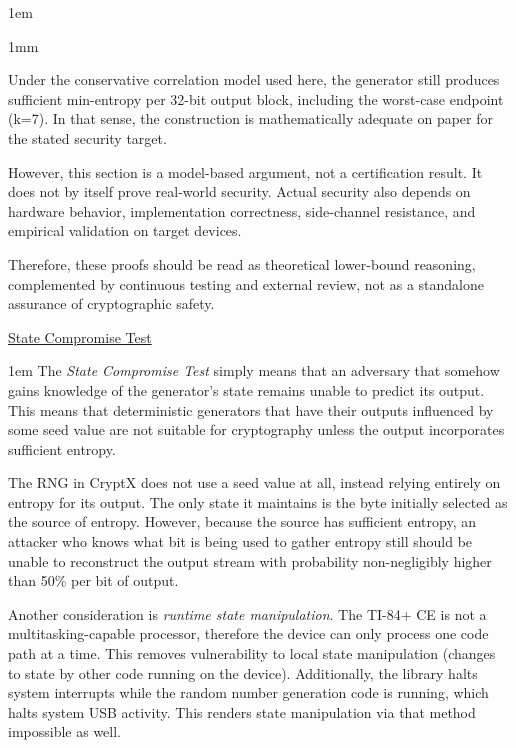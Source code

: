 \documentclass[titlepage]{report}
\renewcommand{\qed}{}
\renewenvironment{proof}{\begin{mdframed}[backgroundcolor=ltgray]\begin{addmargin}[1mm]{1mm}\footnotesize\begin{newproof}}{\end{newproof}\end{addmargin}\end{mdframed}\qed}
\begin{document}
\begin{addmargin}[1em]{1em}
\begin{proof}
				Under the conservative correlation model used here, the generator still produces sufficient min-entropy per 32-bit output block, including the worst-case endpoint (k=7). In that sense, the construction is mathematically adequate on paper for the stated security target.
				
				However, this section is a model-based argument, not a certification result. It does not by itself prove real-world security. Actual security also depends on hardware behavior, implementation correctness, side-channel resistance, and empirical validation on target devices.
				
				Therefore, these proofs should be read as theoretical lower-bound reasoning, complemented by continuous testing and external review, not as a standalone assurance of cryptographic safety.
		\end{proof}
		
	\end{addmargin}
	\ul{State Compromise Test}
	\begin{addmargin}[1em]{1em}
		The \textit{State Compromise Test} simply means that an adversary that somehow gains knowledge of the generator's state remains unable to predict its output. This means that deterministic generators that have their outputs influenced by some seed value are not suitable for cryptography unless the output incorporates sufficient entropy.
		
		The RNG in CryptX does not use a seed value at all, instead relying entirely on entropy for its output. The only state it maintains is the byte initially selected as the source of entropy. However, because the source has sufficient entropy, an attacker who knows what bit is being used to gather entropy still should be unable to reconstruct the output stream with probability non-negligibly higher than 50\% per bit of output.
		
		Another consideration is \textit{runtime state manipulation}. The TI-84+ CE is not a multitasking-capable processor, therefore the device can only process one code path at a time. This removes vulnerability to local state manipulation (changes to state by other code running on the device). Additionally, the library halts system interrupts while the random number generation code is running, which halts system USB activity. This renders state manipulation via that method impossible as well.
	\end{addmargin}
	
\end{document}
